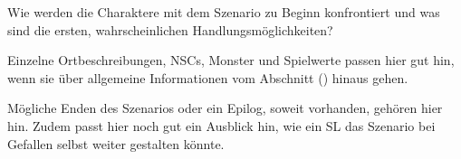 \begin{multicols}{2}

Wie werden die Charaktere mit dem Szenario zu Beginn konfrontiert und was sind die ersten, wahrscheinlichen Handlungsmöglichkeiten? 

\lipsum[10-11]


Einzelne Ortbeschreibungen, NSCs, Monster und Spielwerte passen hier gut hin, wenn sie über allgemeine Informationen vom Abschnitt  () hinaus gehen.

\lipsum[12-15]


Mögliche Enden des Szenarios oder ein Epilog, soweit vorhanden, gehören hier hin. Zudem passt hier noch gut ein Ausblick hin, wie ein SL das Szenario bei Gefallen selbst weiter gestalten könnte.

\lipsum[16-17]

\end{multicols}

\newpage